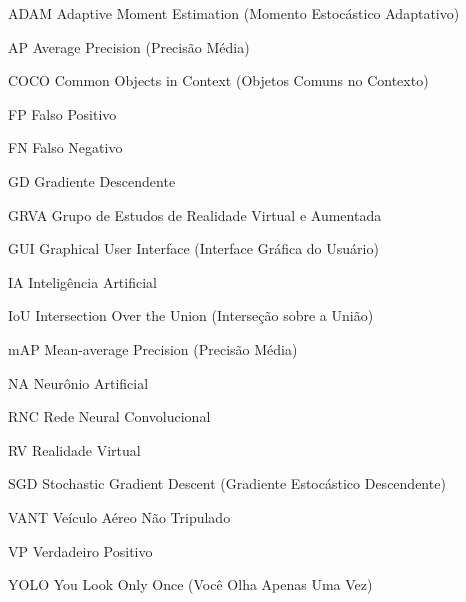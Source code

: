 \documentclass[
	12pt,				%
	openright,			%
	oneside,			%
	a4paper,			%
	english,			%
	french,				%
	spanish,			%
	brazil				%
	]{abntex2}
\newcommand{\listofquadrosname}{Lista de quadros}
\begin{document}

\frenchspacing 











\tableofcontents*
\cleardoublepage

\listoffigures*
\cleardoublepage


\listoftables*
\cleardoublepage

\begin{siglas}
	\item[ADAM] Adaptive Moment Estimation (Momento Estocástico Adaptativo)
	\item[AP] Average Precision (Precisão Média)
	\item[COCO] Common Objects in Context (Objetos Comuns no Contexto)
	\item[FP] Falso Positivo
	\item[FN] Falso Negativo   
	\item[GD] Gradiente Descendente
	\item[GRVA] Grupo de Estudos de Realidade Virtual e Aumentada 
	\item[GUI] Graphical User Interface (Interface Gráfica do Usuário)
	\item[IA] Inteligência Artificial 
	\item[IoU] Intersection Over the Union (Interseção sobre a União)
	\item[mAP] Mean-average Precision (Precisão Média)
	\item[NA] Neurônio Artificial
	\item[RNC] Rede Neural Convolucional
	\item[RV] Realidade Virtual
	\item[SGD] Stochastic Gradient Descent (Gradiente Estocástico Descendente)
	\item[VANT] Veículo Aéreo Não Tripulado	  	
	\item[VP] Verdadeiro Positivo
	\item[YOLO] You Look Only Once (Você Olha Apenas Uma Vez)
\end{siglas}
\end{document}
